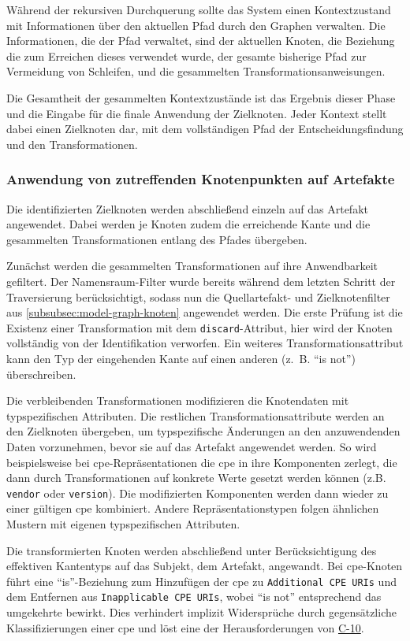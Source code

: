 Während der rekursiven Durchquerung sollte das System einen Kontextzustand mit Informationen über den aktuellen Pfad durch den Graphen verwalten.
Die Informationen, die der Pfad verwaltet, sind der aktuellen Knoten, die Beziehung die zum Erreichen dieses verwendet wurde, der gesamte bisherige Pfad zur Vermeidung von Schleifen, und die gesammelten Transformationsanweisungen.

Die Gesamtheit der gesammelten Kontextzustände ist das Ergebnis dieser Phase und die Eingabe für die finale Anwendung der Zielknoten.
Jeder Kontext stellt dabei einen Zielknoten dar, mit dem vollständigen Pfad der Entscheidungsfindung und den Transformationen.

\subsubsection{Anwendung von zutreffenden Knotenpunkten auf Artefakte}\label{subsubsec:model-result-processing-apply-nodes-to-artifact}

Die identifizierten Zielknoten werden abschließend einzeln auf das Artefakt angewendet.
Dabei werden je Knoten zudem die erreichende Kante und die gesammelten Transformationen entlang des Pfades übergeben.

Zunächst werden die gesammelten Transformationen auf ihre Anwendbarkeit gefiltert.
Der Namensraum-Filter wurde bereits während dem letzten Schritt der Traversierung berücksichtigt, sodass nun die Quellartefakt- und Zielknotenfilter aus \autoref{subsubsec:model-graph-knoten} angewendet werden.
Die erste Prüfung ist die Existenz einer Transformation mit dem \texttt{discard}-Attribut, hier wird der Knoten vollständig von der Identifikation verworfen.
Ein weiteres Transformationsattribut kann den Typ der eingehenden Kante auf einen anderen (z.\ B. \enquote{is not}) überschreiben.

Die verbleibenden Transformationen modifizieren die Knotendaten mit typspezifischen Attributen.
Die restlichen Transformationsattribute werden an den Zielknoten übergeben, um typspezifische Änderungen an den anzuwendenden Daten vorzunehmen, bevor sie auf das Artefakt angewendet werden.
So wird beispielsweise bei \acrshort{cpe}-Repräsentationen die \acrshort{cpe} in ihre Komponenten zerlegt, die dann durch Transformationen auf konkrete Werte gesetzt werden können (z.B. \texttt{vendor} oder \texttt{version}).
Die modifizierten Komponenten werden dann wieder zu einer gültigen \acrshort{cpe} kombiniert.
Andere Repräsentationstypen folgen ähnlichen Mustern mit eigenen typspezifischen Attributen.

Die transformierten Knoten werden abschließend unter Berücksichtigung des effektiven Kantentyps auf das Subjekt, dem Artefakt, angewandt.
Bei \acrshort{cpe}-Knoten führt eine \enquote{is}-Beziehung zum Hinzufügen der \acrshort{cpe} zu \texttt{Additional CPE URIs} und dem Entfernen aus \texttt{Inapplicable CPE URIs}, wobei \enquote{is not} entsprechend das umgekehrte bewirkt.
Dies verhindert implizit Widersprüche durch gegensätzliche Klassifizierungen einer \acrshort{cpe} und löst eine der Herausforderungen von \hyperref[subsec:c-10-order-dependency]{C-10}.
